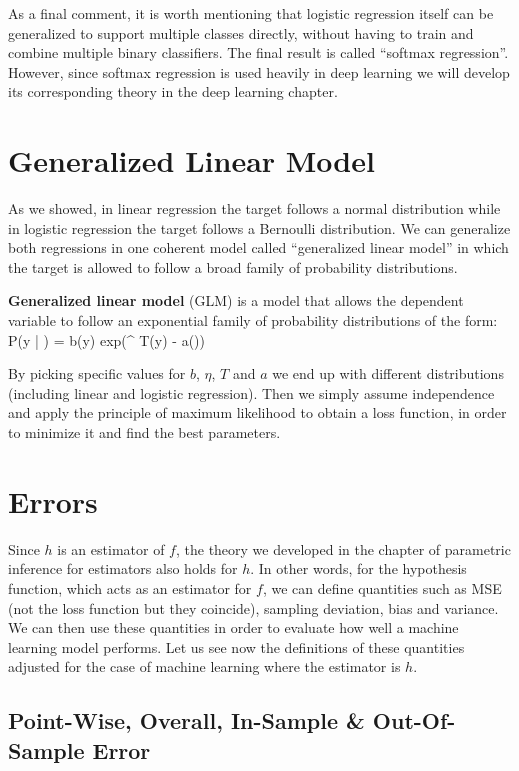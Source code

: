 As a final comment, it is worth mentioning that logistic regression itself can be generalized to support multiple
classes directly, without having to train and combine multiple binary classifiers. The final result is called
``softmax regression''. However, since softmax regression is used heavily in deep learning we will develop its
corresponding theory in the deep learning chapter.

\section{Generalized Linear Model}

As we showed, in linear regression the target follows a normal distribution while in logistic regression the target
follows a Bernoulli distribution. We can generalize both regressions in one coherent model called ``generalized
linear model'' in which the target is allowed to follow a broad family of probability distributions.

\textbf{Generalized linear model} (GLM) is a model that allows the dependent variable to follow an exponential family
of probability distributions of the form:
\bse
P(y | \eta) = b(y) \cdot exp(\eta^{\intercal} T(y) - a(\eta))
\ese
\ed

By picking specific values for $b$, $\eta$, $T$ and $a$ we end up with different distributions (including linear and
logistic regression). Then we simply assume independence and apply the principle of maximum likelihood to obtain a
loss function, in order to minimize it and find the best parameters.

\section{Errors}

Since $h$ is an estimator of $f$, the theory we developed in the chapter of parametric inference for estimators also
holds for $h$. In other words, for the hypothesis function, which acts as an estimator for $f$, we can define
quantities such as MSE (not the loss function but they coincide), sampling deviation, bias and variance. We can then
use these quantities in order to evaluate how well a machine learning model performs. Let us see now the definitions
of these quantities adjusted for the case of machine learning where the estimator is $h$.

\subsection{Point-Wise, Overall, In-Sample \& Out-Of-Sample Error}

